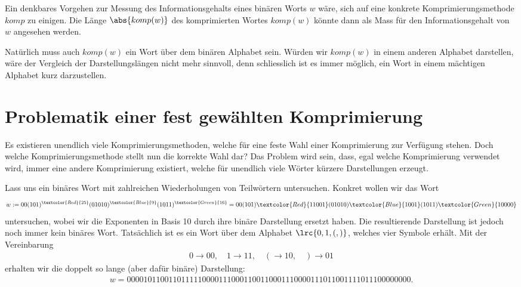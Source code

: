 Ein denkbares Vorgehen zur Messung des Informationsgehalts eines binären Worts $w$ wäre, sich auf eine konkrete Komprimierungsmethode $komp$ zu einigen.
Die Länge $\abs{komp(w)}$ des komprimierten Wortes $komp(w)$ könnte dann als Mass für den Informationsgehalt von $w$ angesehen werden.
\par
Natürlich muss auch $komp(w)$ ein Wort über dem binären Alphabet sein.
Würden wir $komp(w)$ in einem anderen Alphabet darstellen, wäre der Vergleich der Darstellungslängen nicht mehr sinnvoll, denn schliesslich ist es immer möglich, ein Wort in einem mächtigen Alphabet kurz darzustellen.

\section{Problematik einer fest gewählten Komprimierung}
Es existieren unendlich viele Komprimierungsmethoden, welche für eine feste Wahl einer Komprimierung zur Verfügung stehen.
Doch welche Komprimierungsmethode stellt nun die korrekte Wahl dar? Das Problem wird sein, dass, egal welche Komprimierung verwendet wird, immer eine andere Komprimierung existiert, welche für unendlich viele Wörter kürzere Darstellungen erzeugt.

\begin{myexample}\label{myexample:Wiederholungen}
Lass uns ein binäres Wort mit zahlreichen Wiederholungen von Teilwörtern untersuchen. Konkret wollen wir das Wort
\begin{align*}
	w := 00(101)^{\textcolor{Red}{25}}(01010)^{\textcolor{Blue}{9}}(1011)^{\textcolor{Green}{16}} = 00(101)\textcolor{Red}{11001}(01010)\textcolor{Blue}{1001}(1011)\textcolor{Green}{10000}
\end{align*}
untersuchen, wobei wir die Exponenten in Basis 10 durch ihre binäre Darstellung ersetzt haben. Die resultierende Darstellung ist jedoch noch immer kein binäres Wort. Tatsächlich ist es ein Wort über dem Alphabet $\lrc{0, 1, (, )}$, welches vier Symbole erhält. Mit der Vereinbarung
\begin{align*}
	0 \to 00, \quad 1 \to 11, \quad ( \to 10, \quad ) \to 01
\end{align*}
erhalten wir die doppelt so lange (aber dafür binäre) Darstellung:
\begin{align*}
	w = 00001011001101111100001110001100110001110000111011001111011100000000.
\end{align*}
\end{myexample}


